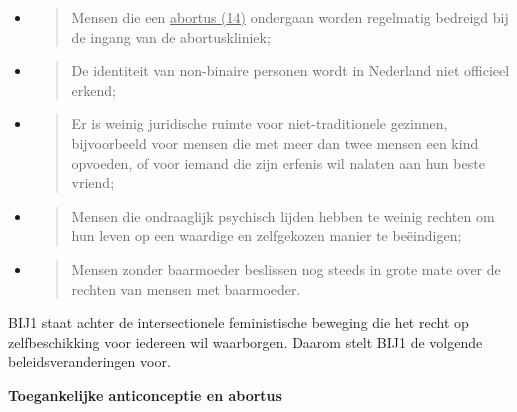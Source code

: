 \begin{itemize}
\item
  \begin{quote}
  Mensen die een \underline{abortus (14)} ondergaan worden regelmatig
  bedreigd bij de ingang van de abortuskliniek;
  \end{quote}
\item
  \begin{quote}
  De identiteit van non-binaire personen wordt in Nederland niet
  officieel erkend;
  \end{quote}
\item
  \begin{quote}
  Er is weinig juridische ruimte voor niet-traditionele gezinnen,
  bijvoorbeeld voor mensen die met meer dan twee mensen een kind
  opvoeden, of voor iemand die zijn erfenis wil nalaten aan hun beste
  vriend;
  \end{quote}
\item
  \begin{quote}
  Mensen die ondraaglijk psychisch lijden hebben te weinig rechten om
  hun leven op een waardige en zelfgekozen manier te beëindigen;
  \end{quote}
\item
  \begin{quote}
  Mensen zonder baarmoeder beslissen nog steeds in grote mate over de
  rechten van mensen met baarmoeder.
  \end{quote}
\end{itemize}

BIJ1 staat achter de intersectionele feministische beweging die het
recht op zelfbeschikking voor iedereen wil waarborgen. Daarom stelt BIJ1
de volgende beleidsveranderingen voor.

\textbf{Toegankelijke anticonceptie en abortus}

